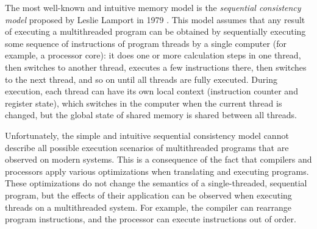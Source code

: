 The most well-known and intuitive memory model is the \emph{sequential consistency model} proposed by Leslie Lamport in 1979 \cite{Lamport:TC79}. This model assumes that any result of executing a multithreaded program can be obtained by sequentially executing some sequence of instructions of program threads by a single computer (for example, a processor core): it does one or more calculation steps in one thread, then switches to another thread, executes a few instructions there, then switches to the next thread, and so on until all threads are fully executed.
During execution, each thread can have its own local context (instruction counter and register state), which switches in the computer when the current thread is changed, but the global state of shared memory is shared between all threads.

Unfortunately, the simple and intuitive sequential consistency model cannot describe all possible execution scenarios of multithreaded programs that are observed on modern systems. This is a consequence of the fact that compilers and processors apply various optimizations when translating and executing programs. These optimizations do not change the semantics of a single-threaded, sequential program, but the effects of their application can be observed when executing threads on a multithreaded system. For example, the compiler can rearrange program instructions, and the processor can execute instructions out of order.

